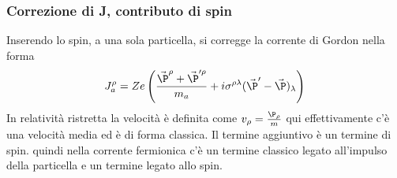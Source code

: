 \documentclass[12pt]{book}
\begin{document}
\begin{itemize}
\subsubsection{Correzione di J, contributo di spin}
Inserendo lo spin, a una sola particella, si corregge la corrente di Gordon nella forma
\begin{equation}
	J^\rho_a = Ze \left( \frac{\vec \P^\rho + \vec \P'^\rho}{m_a} + i \sigma ^{\rho \lambda} ( \vec \P' - \vec \P)_\lambda \right)
\end{equation}
In relatività ristretta la velocità è definita come $v_\rho = \frac{\P_\rho}{m}$ qui effettivamente c'è una velocità media ed è di forma classica. Il termine aggiuntivo è un termine di spin. quindi nella corrente fermionica c'è un termine classico legato all'impulso della particella e un termine legato allo spin. 


\end{itemize}
\end{document}
